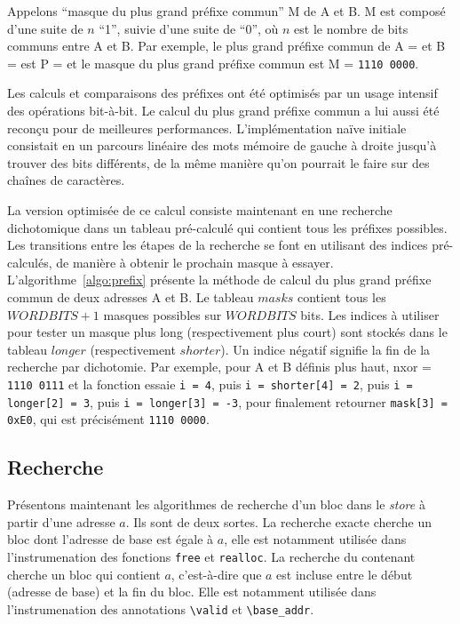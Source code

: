 Appelons ``masque du plus grand préfixe commun'' M de A et B. M est composé
d'une suite de $n$ ``1'', suivie d'une suite de ``0'', où $n$ est le nombre de
bits communs entre A et B.
Par exemple, le plus grand préfixe commun de A =  et
B =  est P =   et le
masque du plus grand préfixe commun est M = \texttt{1110\,0000}.

Les calculs et comparaisons des préfixes ont été optimisés par un usage
intensif des opérations bit-à-bit.
Le calcul du plus grand préfixe commun a lui aussi été reconçu pour de
meilleures performances.
L'implémentation naïve initiale consistait en un parcours linéaire des mots
mémoire de gauche à droite jusqu'à trouver des bits différents, de la même
manière qu'on pourrait le faire sur des chaînes de caractères.

La version optimisée de ce calcul consiste maintenant en une recherche
dichotomique dans un tableau pré-calculé qui contient tous les préfixes
possibles.
Les transitions entre les étapes de la recherche se font en utilisant des
indices pré-calculés, de manière à obtenir le prochain masque à essayer.
L'algorithme~\ref{algo:prefix} présente la méthode de calcul du plus grand
préfixe commun de deux adresses A et B.
Le tableau $masks$ contient tous les $WORDBITS+1$ masques possibles sur
$WORDBITS$ bits.
Les indices à utiliser pour tester un masque plus long (respectivement plus
court) sont stockés dans le tableau $longer$ (respectivement $shorter$).
Un indice négatif signifie la fin de la recherche par dichotomie.
Par exemple, pour A et B définis plus haut, nxor = \texttt{1110\,0111}
et la fonction essaie \lstinline'i = 4', puis \lstinline'i = shorter[4] = 2',
puis \lstinline'i = longer[2] = 3', puis \lstinline'i = longer[3] = -3', pour
finalement retourner \lstinline'mask[3] = 0xE0', qui
est précisément \texttt{1110\,0000}.


\subsection{Recherche}

Présentons maintenant les algorithmes de recherche d'un bloc dans le
\textit{store} à partir d'une adresse $a$.
Ils sont de deux sortes.
La recherche exacte cherche un bloc dont l'adresse de base est égale à $a$, elle
est notamment utilisée dans l'instrumenation des fonctions \lstinline'free' et
\lstinline'realloc'.
La recherche du contenant cherche un bloc qui contient $a$, c'est-à-dire que
$a$ est incluse entre le début (adresse de base) et la fin du bloc.
Elle est notamment utilisée dans l'instrumenation des annotations
\lstinline'\valid' et \lstinline'\base_addr'.

